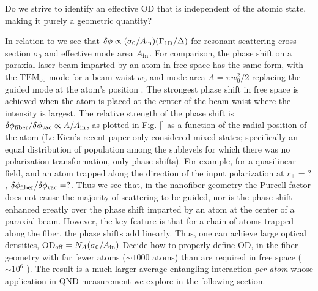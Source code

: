 \documentclass[preprint,aps,pra,onecolumn]{revtex4-1} %
\newcommand{\oneD}{{\rm 1D}}
\newcommand{\vac}{{\rm vac}}
\newcommand{\inp}{{\rm in}}
\newcommand{\Ain}{A_{\rm in}}
\newcommand{\change}[1]{{\color{RoyalBlue} #1}}
\newcommand{\comment}[1]{{\color{Maroon} #1}}
\newcommand{\error}[1]{{\color{red} #1}}
\begin{document}
\comment{Do we strive to identify an effective OD that is independent of the atomic state, making it purely a geometric quantity?}

\change{
In relation to  we see that $\delta \phi \propto (\sigma_0/A_{\rm in}) (\Gamma_{\oneD}/\Delta)$ for resonant scattering cross section $\sigma_0$ and effective mode area $A_\inp$. For comparison, the phase shift on a paraxial laser beam imparted by an atom in free space has the same form, with the $\mathrm{TEM}_{00}$ mode for a beam waist $w_0$ and mode area $A= \pi w_0^2/2$ replacing the guided mode at the atom's position  \cite{tanji-suzuki_chapter_2011, baragiola_three-dimensional_2014}. The strongest phase shift in free space is achieved when the atom is placed at the center of the beam waist where the intensity is largest. The relative strength of the phase shift is $\delta \phi_{\rm fiber}/\delta \phi_{\vac}\propto A/A_{\rm in}$, as plotted in Fig. \ref{} as a function of the radial position of the atom \comment{(Le Kien's recent paper only considered mixed states; specifically an equal distribution of population among the sublevels for which there was no polarization transformation, only phase shifts)}.  For example, for a quasilinear field, and an atom trapped along the direction of the input polarization  at $r_\perp = ?$, $\delta \phi_{\rm fiber}/\delta \phi_{\vac} = ?$.   Thus we see that, in the nanofiber geometry the Purcell factor does not cause the majority of scattering to be guided, nor is the phase shift enhanced greatly over the phase shift imparted by an atom at the center of a paraxial beam. However, the key feature is that for a chain of atoms trapped along the fiber, the phase shifts add linearly.  Thus, one can achieve large optical densities, OD$_{\rm eff} = N_A (\sigma_0/\Ain)$ \comment{Decide how to properly define OD}, in the fiber geometry with far fewer atoms ($\sim 1000$ atoms) than are required in free space (\error{ $\sim 10^6$ }).  The result is a much larger average entangling interaction \emph{per atom} whose application in QND measurement we explore in the following section.
}
\end{document}
